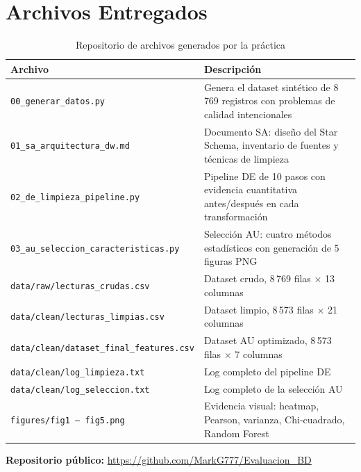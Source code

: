 \section{Archivos Entregados}

\begin{table}[h!]
  \centering
  \caption{Repositorio de archivos generados por la pr\'actica}
  \begin{tabularx}{\textwidth}{lX}
    \toprule
    \textbf{Archivo} & \textbf{Descripci\'on} \\
    \midrule
    \texttt{00\_generar\_datos.py}              & Genera el dataset sint\'etico de 8\,769 registros con problemas de calidad intencionales \\
    \texttt{01\_sa\_arquitectura\_dw.md}         & Documento SA: dise\~no del Star Schema, inventario de fuentes y t\'ecnicas de limpieza \\
    \texttt{02\_de\_limpieza\_pipeline.py}       & Pipeline DE de 10 pasos con evidencia cuantitativa antes/despu\'es en cada transformaci\'on \\
    \texttt{03\_au\_seleccion\_caracteristicas.py} & Selecci\'on AU: cuatro m\'etodos estad\'isticos con generaci\'on de 5 figuras PNG \\
    \texttt{data/raw/lecturas\_crudas.csv}       & Dataset crudo, 8\,769 filas $\times$ 13 columnas \\
    \texttt{data/clean/lecturas\_limpias.csv}    & Dataset limpio, 8\,573 filas $\times$ 21 columnas \\
    \texttt{data/clean/dataset\_final\_features.csv} & Dataset AU optimizado, 8\,573 filas $\times$ 7 columnas \\
    \texttt{data/clean/log\_limpieza.txt}        & Log completo del pipeline DE \\
    \texttt{data/clean/log\_seleccion.txt}       & Log completo de la selecci\'on AU \\
    \texttt{figures/fig1\,--\,fig5.png}          & Evidencia visual: heatmap, Pearson, varianza, Chi-cuadrado, Random Forest \\
    \bottomrule
  \end{tabularx}
\end{table}

\vspace{0.5cm}
\begin{center}
  \textbf{Repositorio p\'ublico:}
  \url{https://github.com/MarkG777/Evaluacion_BD}
\end{center}

